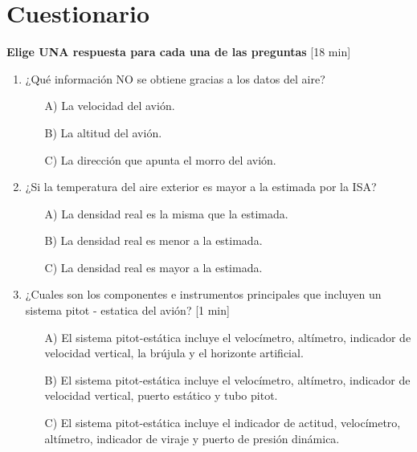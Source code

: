 \chapter*{Cuestionario} %
\chapterspaceabove{6.75cm} %
\chapterspacebelow{7.25cm} %
\pagestyle{empty}
\begin{nosangria}
\Large{\textbf{Elige UNA respuesta para cada una de las preguntas} [18 min]}
\end{nosangria}

\begin{enumerate}
\item ¿Qué información NO se obtiene gracias a los datos del aire?

	\begin{itemize}
		\item[A)] La velocidad del avión.
		\item [B)] La altitud del avión.
		\item [C)] La dirección que apunta el morro del avión.\\
	\end{itemize}

\item ¿Si la temperatura del aire exterior es mayor a la estimada por la ISA?

	\begin{itemize}
		\item[A)] La densidad real es la misma que la estimada.
		\item [B)] La densidad real es menor a la estimada.
		\item [C)] La densidad real es mayor a la estimada.\\
	\end{itemize}


\item ¿Cuales son los componentes e instrumentos principales que incluyen un sistema pitot - estatica del avión? [1 min]

    \begin{itemize}
    \item[A)] El sistema pitot-estática incluye el velocímetro, altímetro, indicador de velocidad vertical, la brújula y el horizonte artificial.
    \item[B)] El sistema pitot-estática incluye el velocímetro, altímetro, indicador de velocidad vertical, puerto estático y tubo pitot.
    \item[C)] El sistema pitot-estática incluye el indicador de actitud, velocímetro, altímetro, indicador de viraje y puerto de presión dinámica.\\
     \end{itemize}


\end{enumerate}
